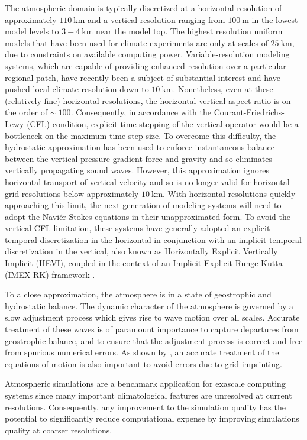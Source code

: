 \documentclass[11pt]{article}
\begin{document}
The atmospheric domain is typically discretized at a horizontal resolution of approximately $110\ \mbox{km}$ and a vertical resolution ranging from $100\ \mbox{m}$ in the lowest model levels to $3-4\ \mbox{km}$ near the model top.  The highest resolution uniform models that have been used for climate experiments are only at scales of $25\ \mbox{km}$, due to constraints on available computing power.  Variable-resolution modeling systems, which are capable of providing enhanced resolution over a particular regional patch, have recently been a subject of substantial interest and have pushed local climate resolution down to $10\ \mbox{km}$.  Nonetheless, even at these (relatively fine) horizontal resolutions, the horizontal-vertical aspect ratio is on the order of $\sim\ 100$.  Consequently, in accordance with the Courant-Friedrichs-Lewy (CFL) condition, explicit time stepping of the vertical operator would be a bottleneck on the maximum time-step size.  To overcome this difficulty, the hydrostatic approximation has been used to enforce instantaneous balance between the vertical pressure gradient force and gravity and so eliminates vertically propagating sound waves.  However, this approximation ignores horizontal transport of vertical velocity and so is no longer valid for horizontal grid resolutions below approximately $10\ \mbox{km}$.  With horizontal resolutions quickly approaching this limit, the next generation of modeling systems will need to adopt the Navi\'er-Stokes equations in their unapproximated form.  To avoid the vertical CFL limitation, these systems have generally adopted an explicit temporal discretization in the horizontal in conjunction with an implicit temporal discretization in the vertical, also known as Horizontally Explicit Vertically Implicit (HEVI), coupled in the context of an Implicit-Explicit Runge-Kutta (IMEX-RK) framework \cite{UASJRRJS1997AMM, PAUCJ2012MWR, HWSJLNW2013JCP}.

To a close approximation, the atmosphere is in a state of geostrophic and hydrostatic balance.  The dynamic character of the atmosphere is governed by a slow adjustment process which gives rise to wave motion over all scales.  Accurate treatment of these waves is of paramount importance to capture departures from geostrophic balance, and to ensure that the adjustment process is correct and free from spurious numerical errors.  As shown by \cite{PHLCJMATRDN2010JAMES}, an accurate treatment of the equations of motion is also important to avoid errors due to grid imprinting.  

Atmospheric simulations are a benchmark application for exascale computing systems since many important climatological features are unresolved at current resolutions.  Consequently, any improvement to the simulation quality has the potential to significantly reduce computational expense by improving simulations quality at coarser resolutions.
\end{document}
